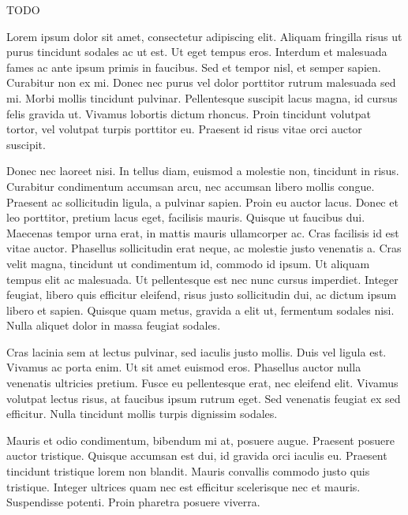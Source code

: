 TODO \cite{Koscher2010}

Lorem ipsum dolor sit amet, consectetur adipiscing elit. Aliquam fringilla risus ut purus tincidunt sodales ac ut est. Ut eget tempus eros. Interdum et malesuada fames ac ante ipsum primis in faucibus. Sed et tempor nisl, et semper sapien. Curabitur non ex mi. Donec nec purus vel dolor porttitor rutrum malesuada sed mi. Morbi mollis tincidunt pulvinar. Pellentesque suscipit lacus magna, id cursus felis gravida ut. Vivamus lobortis dictum rhoncus. Proin tincidunt volutpat tortor, vel volutpat turpis porttitor eu. Praesent id risus vitae orci auctor suscipit.

Donec nec laoreet nisi. In tellus diam, euismod a molestie non, tincidunt in risus. Curabitur condimentum accumsan arcu, nec accumsan libero mollis congue. Praesent ac sollicitudin ligula, a pulvinar sapien. Proin eu auctor lacus. Donec et leo porttitor, pretium lacus eget, facilisis mauris. Quisque ut faucibus dui. Maecenas tempor urna erat, in mattis mauris ullamcorper ac. Cras facilisis id est vitae auctor. Phasellus sollicitudin erat neque, ac molestie justo venenatis a. Cras velit magna, tincidunt ut condimentum id, commodo id ipsum. Ut aliquam tempus elit ac malesuada. Ut pellentesque est nec nunc cursus imperdiet. Integer feugiat, libero quis efficitur eleifend, risus justo sollicitudin dui, ac dictum ipsum libero et sapien. Quisque quam metus, gravida a elit ut, fermentum sodales nisi. Nulla aliquet dolor in massa feugiat sodales.

Cras lacinia sem at lectus pulvinar, sed iaculis justo mollis. Duis vel ligula est. Vivamus ac porta enim. Ut sit amet euismod eros. Phasellus auctor nulla venenatis ultricies pretium. Fusce eu pellentesque erat, nec eleifend elit. Vivamus volutpat lectus risus, at faucibus ipsum rutrum eget. Sed venenatis feugiat ex sed efficitur. Nulla tincidunt mollis turpis dignissim sodales.

Mauris et odio condimentum, bibendum mi at, posuere augue. Praesent posuere auctor tristique. Quisque accumsan est dui, id gravida orci iaculis eu. Praesent tincidunt tristique lorem non blandit. Mauris convallis commodo justo quis tristique. Integer ultrices quam nec est efficitur scelerisque nec et mauris. Suspendisse potenti. Proin pharetra posuere viverra.